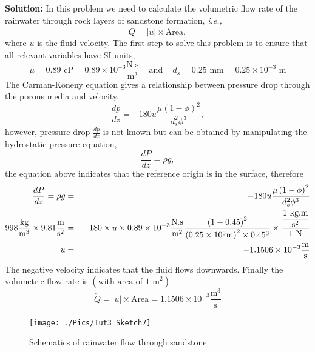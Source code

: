 \documentclass[12pts,a4paper,amsmath,amssymb,floatfix]{article}%
\newcommand{\ie}{{\em{i.e., }}}
\newcommand{\frc}{\displaystyle\frac}
\begin{document}
\begin{enumerate}[label=\bfseries Problem \arabic*:]
{\bf Solution:} In this problem we need to calculate the volumetric flow rate of the rainwater through rock layers of sandstone formation, \ie
\begin{displaymath}
  \dot{Q} = \left|u\right| \times \text{Area},
\end{displaymath}
where $u$ is the fluid velocity. The first step to solve this problem is to ensure that all relevant variables have SI units,
\begin{displaymath}
   \mu = 0.89 \text{ cP} = 0.89\times 10^{-3} \frc{\text{N.s}}{\text{m}^{2}}\;\;\;\text{ and }\;\;\; d_{s} = 0.25\text{ mm} = 0.25\times 10^{-3}\text{ m}
\end{displaymath}
The Carman-Koneny equation gives a relationship between pressure drop through the porous media and velocity, 
\begin{displaymath}
    \frc{dp}{dz} = -180u \frc{\mu\left(1-\phi\right)^{2}}{d_{s}^{2}\phi^{3}},
\end{displaymath}
however, pressure drop $\frac{dp}{dz}$ is not known but can be obtained by manipulating the hydrostatic pressure equation,
\begin{displaymath}
    \frc{dP}{dz} = \rho g, 
\end{displaymath}
the equation above indicates that the reference origin is in the surface, therefore
\begin{eqnarray}
  \frc{dP}{dz} = \rho g &=& -180u \frc{\mu\left(1-\phi\right)^{2}}{d_{s}^{2}\phi^{3}} \nonumber \\
  998 \frc{\text{kg}}{\text{m}^{3}} \times 9.81\frc{\text{m}}{\text{s}^{2}} &=& - 180 \times u \times 0.89\times 10^{-3} \frc{\text{N.s}}{\text{m}^{2}} \frc{\left(1-0.45\right)^{2}}{\left(0.25\times 10^{\-3}\text{m}\right)^{2}\times 0.45^{3}} \times \frc{\frc{1\text{ kg.m}}{\text{s}^{2}}}{1\text{ N}} \nonumber \\
   u &=& -1.1506\times 10^{-3} \frc{\text{m}}{\text{s}}  \nonumber
\end{eqnarray}
The negative velocity indicates that the fluid flows downwards. Finally the volumetric flow rate is $\left(\text{with area of 1 m}^{2}\right)$
\begin{displaymath}
  \dot{Q} = \left|u\right| \times \text{Area} = 1.1506\times 10^{-3} \frc{\text{m}^{3}}{\text{s}}
\end{displaymath}



      \begin{figure}[h]%
        \begin{center}
          \texttt{[image: ./Pics/Tut3\_Sketch7]}
        \end{center}
        \caption{Schematics of rainwater flow through sandstone.}\label{SolutionProb5}
      \end{figure}



\end{enumerate} 


\clearpage

%
\end{document}
